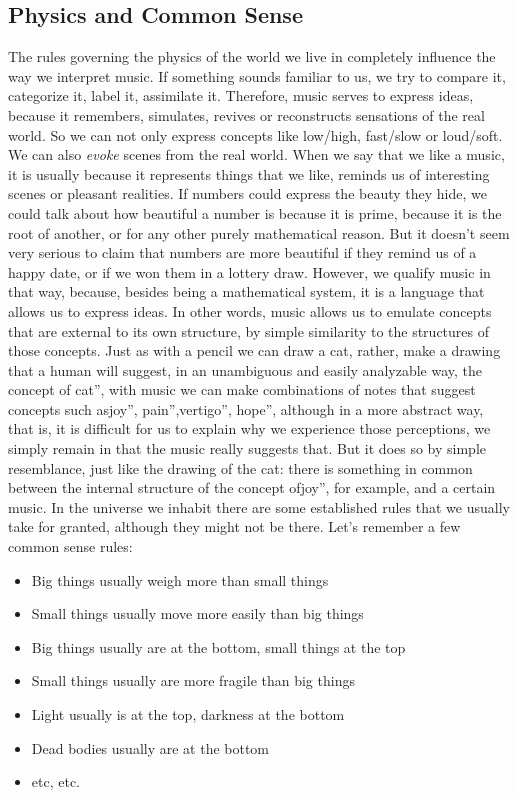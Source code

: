 \documentclass[]{report}
\providecommand{\tightlist}{%
\setlength{\itemsep}{0pt}
\setlength{\parskip}{0pt}
}
\begin{document}
\subsection{Physics and Common Sense}
The rules governing the physics of the world we live in completely influence the way we interpret music. If something sounds familiar to us, we try to compare it, categorize it, label it, assimilate it. Therefore, music serves to express ideas, because it remembers, simulates, revives or reconstructs sensations of the real world. So we can not only express concepts like low/high, fast/slow or loud/soft. We can also \emph{evoke} scenes from the real world. When we say that we like a music, it is usually because it represents things that we like, reminds us of interesting scenes or pleasant realities.
If numbers could express the beauty they hide, we could talk about how beautiful a number is because it is prime, because it is the root of another, or for any other purely mathematical reason. But it doesn't seem very serious to claim that numbers are more beautiful if they remind us of a happy date, or if we won them in a lottery draw. However, we qualify music in that way, because, besides being a mathematical system, it is a language that allows us to express ideas.
In other words, music allows us to emulate concepts that are external to its own structure, by simple similarity to the structures of those concepts. Just as with a pencil we can draw a cat, rather, make a drawing that a human will suggest, in an unambiguous and easily analyzable way, the concept of cat'', with music we can make combinations of notes that suggest concepts such asjoy'', pain'',vertigo'', hope'', although in a more abstract way, that is, it is difficult for us to explain why we experience those perceptions, we simply remain in that the music really suggests that. But it does so by simple resemblance, just like the drawing of the cat: there is something in common between the internal structure of the concept ofjoy'', for example, and a certain music.
In the universe we inhabit there are some established rules that we usually take for granted, although they might not be there. Let's remember a few common sense rules:
\begin{itemize}
\tightlist%
\item Big things usually weigh more than small things
\item Small things usually move more easily than big things
\item Big things usually are at the bottom, small things at the top
\item Small things usually are more fragile than big things
\item Light usually is at the top, darkness at the bottom
\item Dead bodies usually are at the bottom
\item etc, etc.
\end{itemize}
\end{document}
